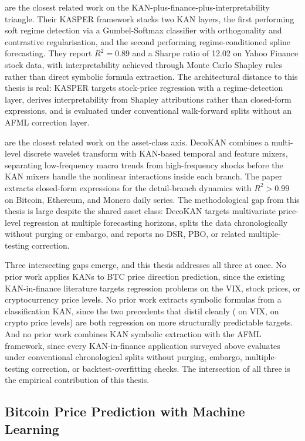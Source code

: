 \documentclass[12pt,a4paper,oneside]{article}
\begin{document}
\citet{oad_kasper_2025} are the closest related work on the KAN-plus-finance-plus-interpretability triangle. Their KASPER framework stacks two KAN layers, the first performing soft regime detection via a Gumbel-Softmax classifier with orthogonality and contrastive regularisation, and the second performing regime-conditioned spline forecasting. They report $R^2 = 0.89$ and a Sharpe ratio of 12.02 on Yahoo Finance stock data, with interpretability achieved through Monte Carlo Shapley rules rather than direct symbolic formula extraction. The architectural distance to this thesis is real: KASPER targets stock-price regression with a regime-detection layer, derives interpretability from Shapley attributions rather than closed-form expressions, and is evaluated under conventional walk-forward splits without an AFML correction layer.

\citet{gao_decokan_2025} are the closest related work on the asset-class axis. DecoKAN combines a multi-level discrete wavelet transform with KAN-based temporal and feature mixers, separating low-frequency macro trends from high-frequency shocks before the KAN mixers handle the nonlinear interactions inside each branch. The paper extracts closed-form expressions for the detail-branch dynamics with $R^2 > 0.99$ on Bitcoin, Ethereum, and Monero daily series. The methodological gap from this thesis is large despite the shared asset class: DecoKAN targets multivariate price-level regression at multiple forecasting horizons, splits the data chronologically without purging or embargo, and reports no DSR, PBO, or related multiple-testing correction.

Three intersecting gaps emerge, and this thesis addresses all three at once. No prior work applies KANs to BTC price direction prediction, since the existing KAN-in-finance literature targets regression problems on the VIX, stock prices, or cryptocurrency price levels. No prior work extracts symbolic formulas from a classification KAN, since the two precedents that distil cleanly (\citet{cho_lee_kim_2025} on VIX, \citet{gao_decokan_2025} on crypto price levels) are both regression on more structurally predictable targets. And no prior work combines KAN symbolic extraction with the AFML framework, since every KAN-in-finance application surveyed above evaluates under conventional chronological splits without purging, embargo, multiple-testing correction, or backtest-overfitting checks. The intersection of all three is the empirical contribution of this thesis.


\subsection{Bitcoin Price Prediction with Machine Learning}\label{subsec:lit_btc}
\end{document}
